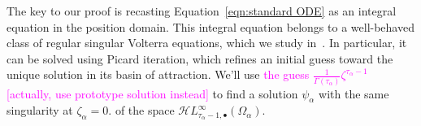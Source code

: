 \documentclass{article}
\newcommand{\singexp}[2]{\mathcal{H}L^\infty_{#1, #2}}
\newcommand{\singexpalg}[1]{\singexp{#1}{\bullet}}
\theoremstyle{definition}
\theoremstyle{plain}
\newtheorem{theorem}{Theorem}[section]
\begin{document}
The key to our proof is recasting Equation~\eqref{eqn:standard ODE} as an integral equation in the position domain. This integral equation belongs to a well-behaved class of regular singular Volterra equations, which we study in~\cite{reg-sing-volterra}. In particular, it can be solved using Picard iteration, which refines an initial guess toward the unique solution in its basin of attraction. We'll use \textcolor{magenta}{the guess $\frac{1}{\Gamma(\tau_\alpha)} \zeta^{\tau_\alpha - 1}$ [actually, use prototype solution instead]} to find a solution $\psi_\alpha$ with the same singularity at $\zeta_\alpha = 0$.
of the space $\singexpalg{\tau_\alpha-1}(\Omega_\alpha)$.
\end{document}
